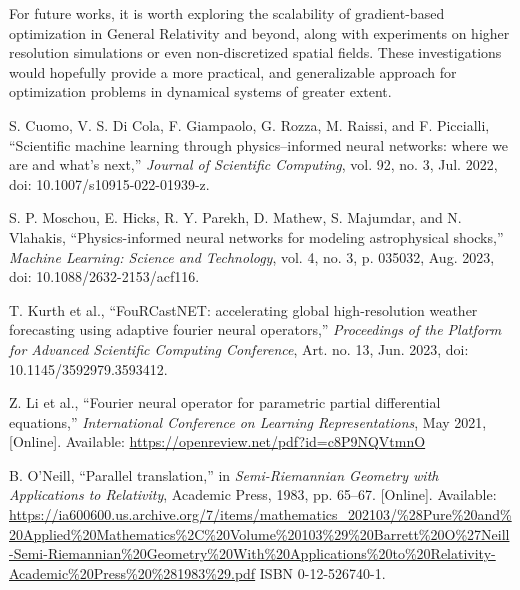 \documentclass[conference]{IEEEtran}
\begin{document}
For future works, it is worth exploring the scalability of 
gradient-based optimization in General Relativity and beyond, 
along with experiments on higher resolution simulations or even 
non-discretized spatial fields. These investigations would hopefully 
provide a more practical, and generalizable approach for optimization 
problems in dynamical systems of greater extent. 



















\begin{thebibliography}{00}
S. Cuomo, V. S. Di Cola, F. Giampaolo, G. Rozza, M. Raissi, and F. Piccialli, ``Scientific machine learning through physics–informed neural networks: where we are and what’s next,'' \textit{Journal of Scientific Computing}, vol. 92, no. 3, Jul. 2022, doi: 10.1007/s10915-022-01939-z.

S. P. Moschou, E. Hicks, R. Y. Parekh, D. Mathew, S. Majumdar, and N. Vlahakis, ``Physics-informed neural networks for modeling astrophysical shocks,'' \textit{Machine Learning: Science and Technology}, vol. 4, no. 3, p. 035032, Aug. 2023, doi: 10.1088/2632-2153/acf116.

T. Kurth et al., ``FouRCastNET: accelerating global high-resolution weather forecasting using adaptive fourier neural operators,'' \textit{Proceedings of the Platform for Advanced Scientific Computing Conference}, Art. no. 13, Jun. 2023, doi: 10.1145/3592979.3593412.

Z. Li et al., ``Fourier neural operator for parametric partial differential equations,'' \textit{International Conference on Learning Representations}, May 2021, [Online]. Available: \url{https://openreview.net/pdf?id=c8P9NQVtmnO}

B. O’Neill, ``Parallel translation,'' in \textit{Semi-Riemannian Geometry with Applications to Relativity}, Academic Press, 1983, pp. 65--67. [Online]. Available: \url{https://ia600600.us.archive.org/7/items/mathematics_202103/%28Pure%20and%20Applied%20Mathematics%2C%20Volume%20103%29%20Barrett%20O%27Neill-Semi-Riemannian%20Geometry%20With%20Applications%20to%20Relativity-Academic%20Press%20%281983%29.pdf} ISBN 0-12-526740-1.


\end{thebibliography}
\end{document}
